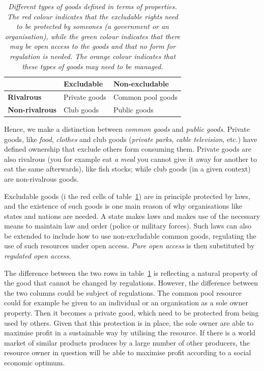 \documentclass[11pt,fleqn]{book} %
\begin{document}
\begin{table}[ht]
\centering
\caption{\textit{Different types of goods defined in terms of properties. The red colour indicates that the excludable rights need to be protected by someones (a government or an organisation), while the green colour indicates that there may be open access to the goods and that no form for regulation is needed. The orange colour indicates that these types of goods may need to be managed.}}
\begingroup
\setlength{\tabcolsep}{10pt} %
\renewcommand{\arraystretch}{1.7} %
\begin{tabular}{l | l | l |}
 & \textbf{Excludable} & \textbf{Non-excludable}\\
\hline
\textbf{Rivalrous} & \cellcolor[rgb]{1,0.9,0.9}Private goods & \cellcolor[rgb]{1,0.95,0.85}Common pool goods \\
\hline
\textbf{Non-rivalrous} &  \cellcolor[rgb]{1,0.9,0.9}Club goods & \cellcolor[rgb]{0.9,1,.9}Public goods \\
\hline
\end{tabular}
\endgroup
\label{table:ownership}
\end{table}

Hence, we make a distinction between \textit{common goods} and \textit{public goods}. Private goods, like \textit{food}, \textit{clothes} and club goods (\textit{private parks}, \textit{cable television}, etc.) have defined ownership that exclude others form consuming them. Private goods are also rivalrous (you for example eat \textit{a meal} you cannot give it away for another to eat the same afterwards), like fish stocks; while club goods (in a given context) are non-rivalrous goods.

Excludable goods (i the red cells of table~\ref{table:ownership}) are in principle protected by laws, and the existence of such goods is one main reason of why organisations like states and nations are needed. A state makes laws and makes use of the necessary means to maintain law and order (police or military forces). Such laws can also be extended to include how to use non-excludable common goods, regulating the use of such resources under open access. \textit{Pure open access} is then substituted by \textit{regulated open access}.

The difference between the two rows in table~\ref{table:ownership} is reflecting a natural property of the good that cannot be changed by regulations. However, the difference between the two columns could be subject of regulations. The common pool resource could for example be given to an individual or an organisation as a sole owner property. Then it becomes a private good, which need to be protected from being used by others. Given that this protection is in place, the sole owner are able to maximise profit in a sustainable way by utilising the resource\cite{Gordon1954}. If there is a world market of similar products produces by a large number of other producers, the resource owner in question will be able to maximise profit according to a social economic optimum.
\end{document}
